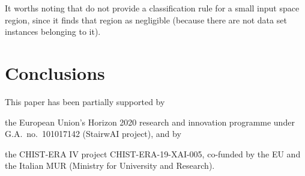 \documentclass[
]{ceurart}
\begin{document}
It worths noting that \gridex{} do not provide a classification rule for a small input space region, since it finds that region as negligible (because there are not data set instances belonging to it).

\section{Conclusions}\label{sec:conclusions}



\begin{acknowledgments}
	This paper has been partially supported by
	\begin{inlinelist}
		\item the European Union's Horizon 2020 research and innovation programme under G.A.\ no.\ 101017142 (StairwAI project), and by
		\item the CHIST-ERA IV project CHIST-ERA-19-XAI-005, co-funded by the EU and the Italian MUR (Ministry for University and Research).
	\end{inlinelist}
\end{acknowledgments}


\end{document}
